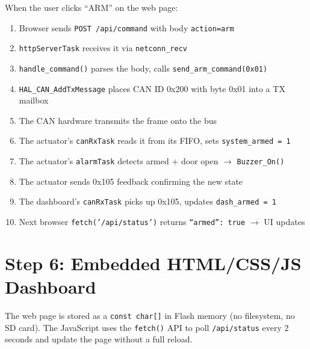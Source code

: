 \documentclass[11pt,a4paper]{article}
\begin{document}
\begin{infobox}
When the user clicks ``ARM'' on the web page:
\begin{enumerate}
  \item Browser sends \texttt{POST /api/command} with body \texttt{action=arm}
  \item \texttt{httpServerTask} receives it via \texttt{netconn\_recv}
  \item \texttt{handle\_command()} parses the body, calls \texttt{send\_arm\_command(0x01)}
  \item \texttt{HAL\_CAN\_AddTxMessage} places CAN ID 0x200 with byte 0x01 into a TX mailbox
  \item The CAN hardware transmits the frame onto the bus
  \item The actuator's \texttt{canRxTask} reads it from its FIFO, sets \texttt{system\_armed = 1}
  \item The actuator's \texttt{alarmTask} detects armed + door open $\rightarrow$ \texttt{Buzzer\_On()}
  \item The actuator sends 0x105 feedback confirming the new state
  \item The dashboard's \texttt{canRxTask} picks up 0x105, updates \texttt{dash\_armed = 1}
  \item Next browser \texttt{fetch('/api/status')} returns \texttt{``armed'': true} $\rightarrow$ UI updates
\end{enumerate}
\end{infobox}

\newpage

\section{Step 6: Embedded HTML/CSS/JS Dashboard}

The web page is stored as a \texttt{const char[]} in Flash memory (no filesystem, no SD card). The JavaScript uses the \texttt{fetch()} API to poll \texttt{/api/status} every 2 seconds and update the page without a full reload.
\end{document}
